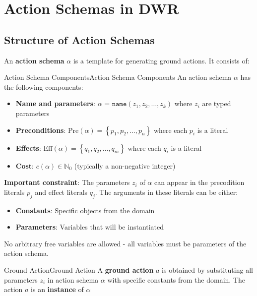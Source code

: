 \documentclass[a4paper]{article}
\theoremstyle{definition}
\begin{document}
\section{Action Schemas in DWR}
\subsection{Structure of Action Schemas}
An \textbf{action schema} \( \alpha \) is a template for generating ground actions. It consists of:
\begin{definition}{Action Schema Components}{Action Schema Components}
An action schema \( \alpha \) has the following components:
\begin{itemize}
    \item \textbf{Name and parameters}: \( \alpha \) = \( \texttt{name}(z_1, z_2, \ldots, z_k ) \) where \( z_i \) are typed parameters 
    \item \textbf{Preconditions}: \( \text{Pre}(\alpha) = \left\{ p_1,p_2, \ldots, p_n \right\} \) where each \( p_i \) is a literal 
    \item \textbf{Effects}: \( \text{Eff}(\alpha) = \left\{ q_1,q_2, \ldots, q_m \right\} \) where each \( q_i \) is a literal 
    \item \textbf{Cost}: \( c(\alpha) \in \mathbb{N}_0 \) (typically a non-negative integer)
\end{itemize}
\end{definition}
\textbf{Important constraint}: The parameters \( z_i \) of \( \alpha \) can appear in the precodition literals \( p_j \) and effect 
literals \( q_j \). The arguments in these literals can be either:
\begin{itemize}
    \item \textbf{Constants}: Specific objects from the domain 
    \item \textbf{Parameters}: Variables that will be instantiated 
\end{itemize}
No arbitrary free variables are allowed - all variables must be parameters of the action schema. 
\begin{definition}{Ground Action}{Ground Action}
A \textbf{ground action} \( a \) is obtained by substituting all parameters \( z_i \) in action schema \( \alpha \) with specific 
constants from the domain. The action \( a \) is an \textbf{instance} of \( \alpha \)
\end{definition}
\end{document}
